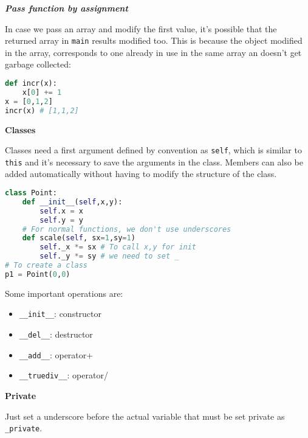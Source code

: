 \documentclass[fontsize=8pt, a4paper, landscape, fleqn]{scrartcl}
\renewcommand{\subsection}[1]{%
    \noindent\colorbox{subsectioncolor}{%
        \parbox{\dimexpr\columnwidth-2\fboxsep}{\color{white}\textbf{#1}}}%
    \vspace{0.5mm}%
}
\renewcommand{\subsubsection}[1]{%
    \noindent\textbf{\textit{\color{subsectioncolor}#1}}%
    \vspace{1mm}%
}
\begin{document}
\begin{multicols*}{3}[\raggedcolumns]
    \subsubsection{Pass function by assignment}
    In case we pass an array and modify the first value, it's possible that the returned array in \lstinline{main} results modified too. This is because the object modified in the array, corresponds to one already in use in the same array an doesn't get garbage collected:

    \begin{multicols}{2}
    \begin{lstlisting}[language=python, breaklines]
def incr(x):
    x[0] += 1
x = [0,1,2]
incr(x) # [1,1,2] \end{lstlisting}    
    \end{multicols}
    
    \subsection{Classes}
    Classes need a first argument defined by convention as \lstinline{self}, which is similar to \lstinline{this} and it's necessary to save the arguments in the class. Members can also be added automatically without having to modify the structure of the class.
\begin{lstlisting}[language=python, breaklines]
class Point:
    def __init__(self,x,y):
        self.x = x
        self.y = y
    # For normal functions, we don't use underscores
    def scale(self, sx=1,sy=1)
        self._x *= sx # To call x,y for init
        self._y *= sy # we need to set _
# To create a class
p1 = Point(0,0)\end{lstlisting}
    Some important operations are: 
    \begin{multicols}{2}
        \begin{itemize}
        \item \lstinline{__init__}: constructor
        \item \lstinline{__del__}: destructor
        \item \lstinline{__add__}: operator+
        \item \lstinline{__truediv__}: operator/
        \end{itemize}
    \end{multicols}

    
    
    \subsection{Private}
    Just set a underscore before the actual variable that must be set private as \lstinline{_private}.
    

\end{multicols*}
\end{document}
